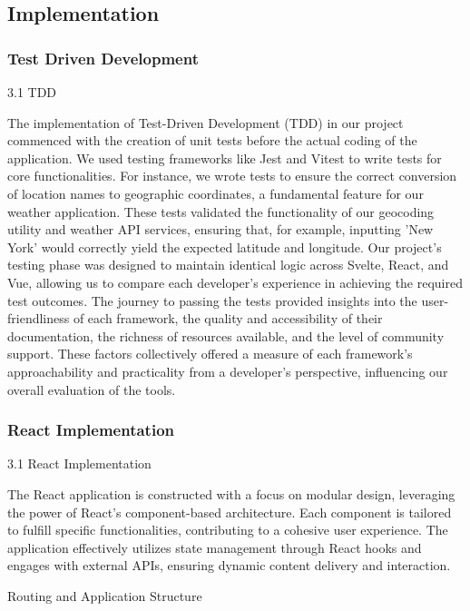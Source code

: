 \subsection*{Implementation}

\subsubsection*{Test Driven Development}

3.1 TDD

The implementation of Test-Driven Development (TDD) in our project commenced with the creation of unit tests before the actual coding of the application. We used testing frameworks like Jest and Vitest to write tests for core functionalities. For instance, we wrote tests to ensure the correct conversion of location names to geographic coordinates, a fundamental feature for our weather application. These tests validated the functionality of our geocoding utility and weather API services, ensuring that, for example, inputting 'New York' would correctly yield the expected latitude and longitude. Our project's testing phase was designed to maintain identical logic across Svelte, React, and Vue, allowing us to compare each developer's experience in achieving the required test outcomes. The journey to passing the tests provided insights into the user-friendliness of each framework, the quality and accessibility of their documentation, the richness of resources available, and the level of community support. These factors collectively offered a measure of each framework's approachability and practicality from a developer's perspective, influencing our overall evaluation of the tools.





\subsubsection*{React Implementation}

3.1 React Implementation

The React application is constructed with a focus on modular design, leveraging the power of React's component-based architecture. Each component is tailored to fulfill specific functionalities, contributing to a cohesive user experience. The application effectively utilizes state management through React hooks and engages with external APIs, ensuring dynamic content delivery and interaction.

Routing and Application Structure




